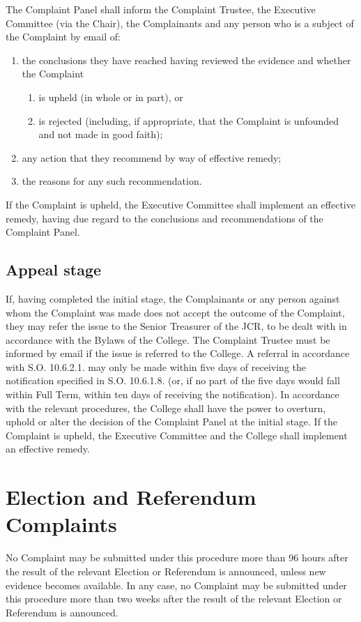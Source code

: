 \npara The Complaint Panel shall inform the Complaint Trustee, the Executive Committee (via the Chair), the Complainants and any person who is a subject of the Complaint by email of:
\begin{enumerate}
\item the conclusions they have reached having reviewed the evidence and whether the Complaint
\begin{enumerate}
\item is upheld (in whole or in part), or
\item is rejected (including, if appropriate, that the Complaint is unfounded and not made in good faith);
\end{enumerate}
\item any action that they recommend by way of effective remedy;
\item the reasons for any such recommendation.
\end{enumerate}
\npara If the Complaint is upheld, the Executive Committee shall implement an effective remedy, having due regard to the conclusions and recommendations of the Complaint Panel.
\subsection{Appeal stage}
\npara If, having completed the initial stage, the Complainants or any person against whom the Complaint was made does not accept the outcome of the Complaint, they may refer the issue to the Senior Treasurer of the JCR, to be dealt with in accordance with the Bylaws of the College.  The Complaint Trustee must be informed by email if the issue is referred to the College.
\npara A referral in accordance with S.O. 10.6.2.1. may only be made within five days of receiving the notification specified in S.O. 10.6.1.8. (or, if no part of the five days would fall within Full Term, within ten days of receiving the notification).
\npara In accordance with the relevant procedures, the College shall have the power to overturn, uphold or alter the decision of the Complaint Panel at the initial stage.
\npara If the Complaint is upheld, the Executive Committee and the College shall implement an effective remedy.
\section{Election and Referendum Complaints}
\npara No Complaint may be submitted under this procedure more than 96 hours after the result of the relevant Election or Referendum is announced, unless new evidence becomes available.  In any case, no Complaint may be submitted under this procedure more than two weeks after the result of the relevant Election or Referendum is announced.
